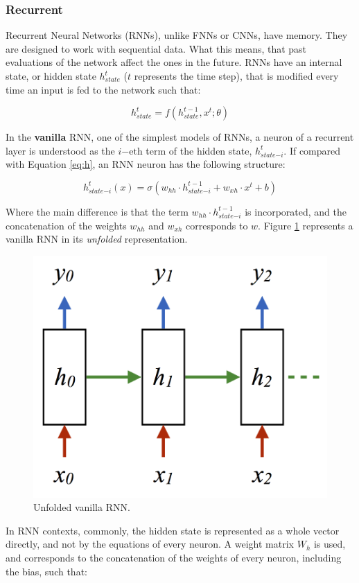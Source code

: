 \subsubsection{Recurrent}
    
Recurrent Neural Networks (RNNs), unlike FNNs or CNNs, have memory. They are designed to work with sequential data. What this means, that past evaluations of the network affect the ones in the future. RNNs have an internal state, or hidden state $h_{state}^{t}$ ($t$ represents the time step), that is modified every time an input is fed to the network such that:

\begin{equation}
    h_{state}^{t} = f(h_{state}^{t-1}, x^{t}; \theta)
\end{equation}

In the \textbf{vanilla} RNN, one of the simplest models of RNNs, a neuron of a recurrent layer is understood as the $i\mathrm{-eth}$ term of the hidden state, $h_{state\mathrm{-}i}^{t}$. If compared with Equation \ref{eq:h}, an RNN neuron has the following structure:

\begin{equation}
    h_{state\mathrm{-}i}^{t}(x) = \sigma(w_{hh} \cdot h_{state\mathrm{-}i}^{t-1} + w_{xh} \cdot x^{t} + b)
\end{equation}

Where the main difference is that the term $w_{hh} \cdot h_{state\mathrm{-}i}^{t-1}$ is incorporated, and the concatenation of the weights $w_{hh}$ and $w_{xh}$ corresponds to $w$. Figure \ref{fig:rnn_unfolded} represents a vanilla RNN in its \emph{unfolded} representation.

\begin{figure}[h]
    \centering
    \includegraphics[width=0.3\linewidth]{imagenes/cap1/unfolded_rnn.png}
    \caption{Unfolded vanilla RNN.}
    \label{fig:rnn_unfolded}
\end{figure}


In RNN contexts, commonly, the hidden state is represented as a whole vector directly, and not by the equations of every neuron. A weight matrix $W_{h}$ is used, and corresponds to the concatenation of the weights of every neuron, including the bias, such that:

